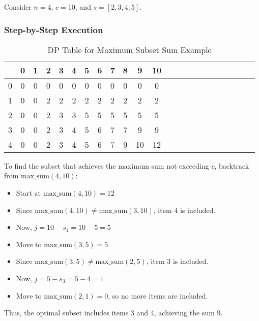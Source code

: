 \documentclass{article}
\begin{document}
Consider \( n = 4 \), \( c = 10 \), and \( s = [2, 3, 4, 5] \).

\subsubsection*{Step-by-Step Execution}

\begin{table}[h!]
    \centering
    \begin{tabular}{c|cccccccccccccccccccccc}
          & 0 & 1 & 2 & 3 & 4 & 5 & 6 & 7 & 8 & 9  & 10 \\
        \hline
        0 & 0 & 0 & 0 & 0 & 0 & 0 & 0 & 0 & 0 & 0  & 0  \\
        1 & 0 & 0 & 2 & 2 & 2 & 2 & 2 & 2 & 2 & 2  & 2  \\
        2 & 0 & 0 & 2 & 3 & 3 & 5 & 5 & 5 & 5 & 5  & 5  \\
        3 & 0 & 0 & 2 & 3 & 4 & 5 & 6 & 7 & 7 & 9  & 9  \\
        4 & 0 & 0 & 2 & 3 & 4 & 5 & 6 & 7 & 9 & 10 & 12 \\
    \end{tabular}
    \caption{DP Table for Maximum Subset Sum Example}
\end{table}

To find the subset that achieves the maximum sum not exceeding \( c \), backtrack from \( \text{max\_sum}(4, 10) \):

\begin{itemize}
    \item Start at \( \text{max\_sum}(4, 10) = 12 \)
    \item Since \( \text{max\_sum}(4, 10) \neq \text{max\_sum}(3, 10) \), item 4 is included.
    \item Now, \( j = 10 - s_4 = 10 - 5 = 5 \)
    \item Move to \( \text{max\_sum}(3, 5) = 5 \)
    \item Since \( \text{max\_sum}(3, 5) \neq \text{max\_sum}(2, 5) \), item 3 is included.
    \item Now, \( j = 5 - s_3 = 5 - 4 = 1 \)
    \item Move to \( \text{max\_sum}(2, 1) = 0 \), so no more items are included.
\end{itemize}

Thus, the optimal subset includes items 3 and 4, achieving the sum 9.
\end{document}
